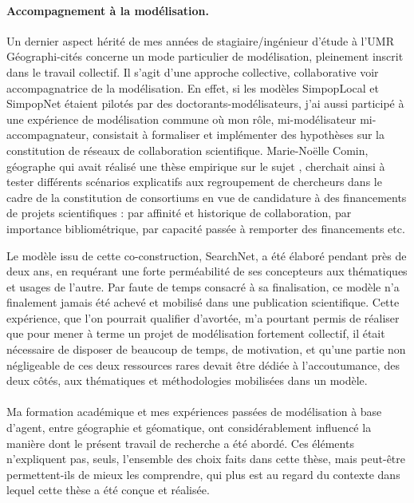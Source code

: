 \paragraph{Accompagnement à la modélisation.}
Un dernier aspect hérité de mes années de stagiaire/ingénieur d'étude à l'UMR Géographi-cités concerne un mode particulier de modélisation, pleinement inscrit dans le travail collectif.
Il s'agit d'une approche collective, collaborative voir accompagnatrice de la modélisation.
En effet, si les modèles SimpopLocal et SimpopNet étaient pilotés par des doctorants-modélisateurs, j'ai aussi participé à une expérience de modélisation commune où mon rôle, mi-modélisateur mi-accompagnateur, consistait à formaliser et implémenter des hypothèses sur la constitution de réseaux de collaboration scientifique.
Marie-Noëlle Comin, géographe qui avait réalisé une thèse empirique sur le sujet \autocite{comin_reseaux_2009}, cherchait ainsi à tester différents scénarios explicatifs aux regroupement de chercheurs dans le cadre de la constitution de consortiums en vue de candidature à des financements de projets scientifiques : par affinité et historique de collaboration, par importance bibliométrique, par capacité passée à remporter des financements etc.

Le modèle issu de cette co-construction, SearchNet, a été élaboré pendant près de deux ans, en requérant une forte perméabilité de ses concepteurs aux thématiques et usages de l'autre.
Par faute de temps consacré à sa finalisation, ce modèle n'a finalement jamais été achevé et mobilisé dans une publication scientifique.
Cette expérience, que l'on pourrait qualifier d'avortée, m'a pourtant permis de réaliser que pour mener à terme un projet de modélisation fortement collectif, il était nécessaire de disposer de beaucoup de temps, de motivation, et qu'une partie non négligeable de ces deux ressources rares devait être dédiée à l'accoutumance, des deux côtés, aux thématiques et méthodologies mobilisées dans un modèle.


\paragraph[Conclusion intermédiaire]{}
Ma formation académique et mes expériences passées de modélisation à base d'agent, entre géographie et géomatique, ont considérablement influencé la manière dont le présent travail de recherche a été abordé.
Ces éléments n'expliquent pas, seuls, l'ensemble des choix faits dans cette thèse, mais peut-être permettent-ils de mieux les comprendre, qui plus est au regard du contexte dans lequel cette thèse a été conçue et réalisée.



